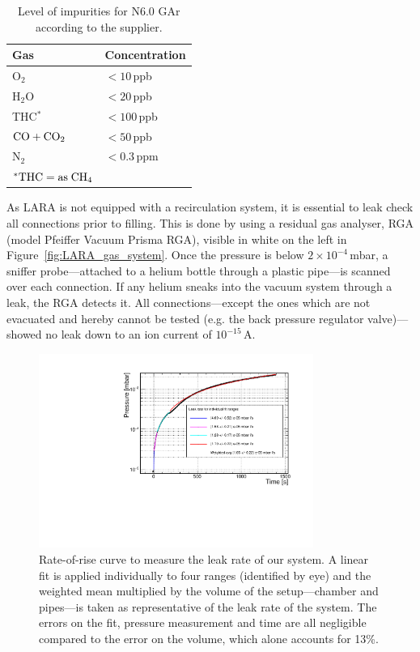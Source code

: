 \documentclass[a4paper,11pt]{article}
\begin{document}
 \begin{table}[tb]
\centering
\caption[]{Level of impurities for N6.0 GAr according to the supplier.}
    
    \smallskip
    \begin{tabular} { ll@{}}
    \toprule
    \multicolumn{1}{l}{Gas} &\multicolumn{1}{l}{Concentration} \\
    \midrule
    O$_2$             & $<10$\,ppb    \\
    H$_2$O            & $<20$\,ppb    \\
    THC$^*$           & $<100$\,ppb   \\
    $\rm CO+CO_2$     & $<50$\,ppb    \\
    N$_2$             & $<0.3$\,ppm   \\
    \multicolumn{1}{l}{\tiny $^*\rm THC = as\; CH_4$} 
    \end{tabular}
    \label{tab:airproducts}
\end{table}
As LARA is not equipped with a recirculation system, it is essential to leak check all connections prior to filling. This is done by using a residual gas analyser, RGA (model Pfeiffer Vacuum Prisma RGA), visible in white on the left in Figure~\ref{fig:LARA_gas_system}. Once the pressure is below $2\times10^{-4}$\,mbar, a sniffer probe---attached to a helium bottle through a plastic pipe---is scanned over each connection. If any helium sneaks into the vacuum system through a leak, the RGA detects it. All connections---except the ones which are not evacuated and hereby cannot be tested (e.g. the back pressure regulator valve)---showed no leak down to an ion current of $10^{-15}$\,A.  

\begin{figure}[tb]
	\begin{center}
	\includegraphics[width=0.8\textwidth]{figures/leak_rate.pdf}
	\caption{Rate-of-rise curve to measure the leak rate of our system. A linear fit is applied individually to four ranges (identified by eye) and the weighted mean multiplied by the volume of the setup---chamber and pipes---is taken as representative of the leak rate of the system. The errors on the fit, pressure measurement and time are all negligible compared to the error on the volume, which alone accounts for 13\%.}
	\label{fig:leak_rate}
	\end{center}
\end{figure}
\end{document}
